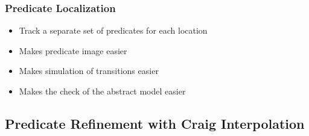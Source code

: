 \begin{frame}
\frametitle{Predicate Localization}

\begin{itemize}
\item Track a \alert{separate set of predicates} for each location
\vfill

\item[\mycheck] Makes predicate image easier

\item[\mycheck] Makes simulation of transitions easier

\item[\mycheck] Makes the check of the abstract model easier

\end{itemize}

\end{frame}


\subsection{Predicate Refinement with Craig Interpolation}

